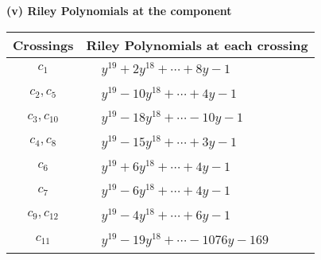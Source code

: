 \documentclass[1p]{elsarticle_modified}
\theoremstyle{definition}
\begin{document}
\newpage\renewcommand{\arraystretch}{1}
\flushleft \textbf{(v) Riley Polynomials at the component}\newline \\
\begin{tabular}{m{50pt}|m{274pt}}
Crossings & \hspace{64pt}Riley Polynomials at each crossing \\
\hline $$\begin{aligned}c_{1}\end{aligned}$$&$\begin{aligned}
&y^{19}+2 y^{18}+\cdots+8 y-1
\end{aligned}$\\
\hline $$\begin{aligned}c_{2},c_{5}\end{aligned}$$&$\begin{aligned}
&y^{19}-10 y^{18}+\cdots+4 y-1
\end{aligned}$\\
\hline $$\begin{aligned}c_{3},c_{10}\end{aligned}$$&$\begin{aligned}
&y^{19}-18 y^{18}+\cdots-10 y-1
\end{aligned}$\\
\hline $$\begin{aligned}c_{4},c_{8}\end{aligned}$$&$\begin{aligned}
&y^{19}-15 y^{18}+\cdots+3 y-1
\end{aligned}$\\
\hline $$\begin{aligned}c_{6}\end{aligned}$$&$\begin{aligned}
&y^{19}+6 y^{18}+\cdots+4 y-1
\end{aligned}$\\
\hline $$\begin{aligned}c_{7}\end{aligned}$$&$\begin{aligned}
&y^{19}-6 y^{18}+\cdots+4 y-1
\end{aligned}$\\
\hline $$\begin{aligned}c_{9},c_{12}\end{aligned}$$&$\begin{aligned}
&y^{19}-4 y^{18}+\cdots+6 y-1
\end{aligned}$\\
\hline $$\begin{aligned}c_{11}\end{aligned}$$&$\begin{aligned}
&y^{19}-19 y^{18}+\cdots-1076 y-169
\end{aligned}$\\
\hline
\end{tabular}\\~\\
\end{document}
